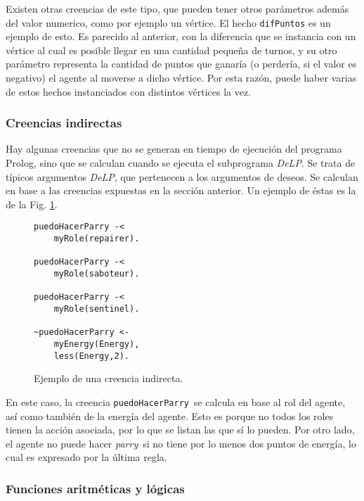 \documentclass[oneside]{book}
\begin{document}
Existen otras creencias de este tipo, que pueden tener otros parámetros además del valor
numerico, como por ejemplo un vértice. El hecho \texttt{difPuntos} es un ejemplo de esto.
Es parecido al anterior, con la diferencia que se instancia con un vértice al cual es
posible llegar en una cantidad pequeña de turnos, y su otro parámetro representa la
cantidad de puntos que ganaría (o perdería, si el valor es negativo) el agente al moverse
a dicho vértice. Por esta razón, puede haber varias de estos hechos instanciados con
distintos vértices la vez.

\subsubsection{Creencias indirectas}

\label{sec:creeciasIndirectas}

Hay algunas creencias que no se generan en tiempo de ejecución del programa Prolog, sino
que se calculan cuando se ejecuta el subprograma \textit{DeLP}. Se trata de típicos argumentos
\textit{DeLP}, que pertenecen a los argumentos de deseos. Se calculan en base a las creencias
expuestas en la sección anterior. Un ejemplo de éstas es la de la Fig. 
\ref{fig:creenciaIndirecta}.

\begin{figure}
\begin{verbatim}
puedoHacerParry -<
    myRole(repairer).

puedoHacerParry -<
    myRole(saboteur).

puedoHacerParry -<
    myRole(sentinel).

~puedoHacerParry <-
    myEnergy(Energy),
    less(Energy,2).
\end{verbatim}

\caption{Ejemplo de una creencia indirecta.}
\label{fig:creenciaIndirecta}

\end{figure}

En este caso, la creencia \texttt{puedoHacerParry}\ se calcula en base al rol del 
agente,
así como también de la energía del agente. Esto es porque no todos los roles tienen la
acción asociada, por lo que se listan las que sí lo pueden. Por otro lado, el agente
no puede hacer \textit{parry}\ si no tiene por lo menos dos puntos de energía, lo cual
es expresado por la última regla.

\subsubsection{Funciones aritméticas y lógicas}
\end{document}
